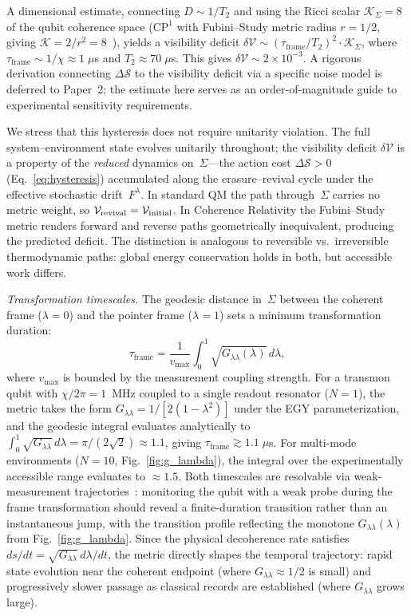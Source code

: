 \documentclass[aps,prd,twocolumn,superscriptaddress,nofootinbib,floatfix]{revtex4-2}
\newcommand{\Sig}{\Sigma}
\newcommand{\Gll}{G_{\lambda\lambda}}
\begin{document}
A dimensional estimate, connecting $D \sim 1/T_2$ and using the Ricci scalar $\mathcal{K}_\Sig = 8$ of the qubit coherence space ($\mathrm{CP}^1$ with Fubini--Study metric radius $r = 1/2$, giving $\mathcal{K} = 2/r^2 = 8$~\cite{bengtssonGeometryQuantumStates2017}), yields a visibility deficit $\delta\mathcal{V} \sim (\tau_{\mathrm{frame}}/T_2)^2 \cdot \mathcal{K}_\Sig$, where $\tau_{\mathrm{frame}} \sim 1/\chi \approx 1\;\mu$s and $T_2 \approx 70\;\mu$s. This gives $\delta\mathcal{V} \sim 2 \times 10^{-3}$. A rigorous derivation connecting $\Delta\mathcal{S}$ to the visibility deficit via a specific noise model is deferred to Paper~2; the estimate here serves as an order-of-magnitude guide to experimental sensitivity requirements.

We stress that this hysteresis does not require unitarity violation. The full system--environment state evolves unitarily throughout; the visibility deficit $\delta\mathcal{V}$ is a property of the \emph{reduced} dynamics on~$\Sig$---the action cost $\Delta\mathcal{S} > 0$ (Eq.~\ref{eq:hysteresis}) accumulated along the erasure--revival cycle under the effective stochastic drift~$F^\lambda$. In standard QM the path through~$\Sig$ carries no metric weight, so $\mathcal{V}_{\rm revival} = \mathcal{V}_{\rm initial}$. In Coherence Relativity the Fubini--Study metric renders forward and reverse paths geometrically inequivalent, producing the predicted deficit. The distinction is analogous to reversible vs.\ irreversible thermodynamic paths: global energy conservation holds in both, but accessible work differs.

\textit{Transformation timescales.} The geodesic distance in~$\Sig$ between the coherent frame ($\lambda = 0$) and the pointer frame ($\lambda = 1$) sets a minimum transformation duration:
\begin{equation}\label{eq:tau}
\tau_{\mathrm{frame}} = \frac{1}{v_{\max}}\int_0^1 \sqrt{\Gll(\lambda)}\,d\lambda,
\end{equation}
where $v_{\max}$ is bounded by the measurement coupling strength. For a transmon qubit with $\chi/2\pi = 1$~MHz coupled to a single readout resonator ($N=1$), the metric takes the form $\Gll = 1/[2(1-\lambda^2)]$ under the EGY parameterization, and the geodesic integral evaluates analytically to $\int_0^1\!\sqrt{\Gll}\,d\lambda = \pi/(2\sqrt{2}) \approx 1.1$, giving $\tau_{\mathrm{frame}} \gtrsim 1.1\;\mu$s. For multi-mode environments ($N=10$, Fig.~\ref{fig:g_lambda}), the integral over the experimentally accessible range evaluates to $\approx 1.5$. Both timescales are resolvable via weak-measurement trajectories~\cite{carlessoTestingLargescaleLimit2020}: monitoring the qubit with a weak probe during the frame transformation should reveal a finite-duration transition rather than an instantaneous jump, with the transition profile reflecting the monotone $\Gll(\lambda)$ from Fig.~\ref{fig:g_lambda}. Since the physical decoherence rate satisfies $ds/dt = \sqrt{\Gll}\,d\lambda/dt$, the metric directly shapes the temporal trajectory: rapid state evolution near the coherent endpoint (where $\Gll \approx 1/2$ is small) and progressively slower passage as classical records are established (where $\Gll$ grows large).
\end{document}
